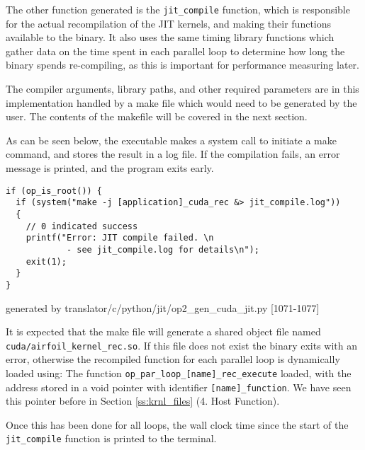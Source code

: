 The other function generated is the \verb|jit_compile| function, which is responsible for the actual recompilation of the JIT kernels, and making their functions available to the binary. It also uses the same timing library functions which gather data on the time spent in each parallel loop to determine how long the binary spends re-compiling, as this is important for performance measuring later.
\par
The compiler arguments, library paths, and other required parameters are in this implementation handled by a make file which would need to be generated by the user. The contents of the makefile will be covered in the next section.
\par
As can be seen below, the executable makes a system call to initiate a make command, and stores the result in a log file. If the compilation fails, an error message is printed, and the program exits early.
\begin{lstlisting}[linewidth = \textwidth, framesep=0pt]
if (op_is_root()) {
  if (system("make -j [application]_cuda_rec &> jit_compile.log"))
  {
    // 0 indicated success
    printf("Error: JIT compile failed. \n
            - see jit_compile.log for details\n");
    exit(1);
  }
}
\end{lstlisting}
\vspace{-1em}
\hspace*{\fill}\footnotesize{generated by translator/c/python/jit/op2\_gen\_cuda\_jit.py [1071-1077]}

It is expected that the make file will generate a shared object file named \verb|cuda/airfoil_kernel_rec.so|. If this file does not exist the binary exits with an error, otherwise the recompiled function for each parallel loop is dynamically loaded using:
The function \verb|op_par_loop_[name]_rec_execute| loaded, with the address stored in a void pointer with identifier \verb|[name]_function|. We have seen this pointer before in Section \ref{ss:krnl_files} (4. Host Function).
\par
Once this has been done for all loops, the wall clock time since the start of the \verb|jit_compile| function is printed to the terminal.

